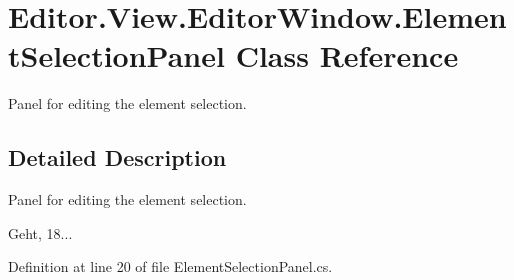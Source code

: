 \section{Editor.\-View.\-Editor\-Window.\-Element\-Selection\-Panel Class Reference}
\label{class_editor_1_1_view_1_1_editor_window_1_1_element_selection_panel}


Panel for editing the element selection.  




\subsection{Detailed Description}
Panel for editing the element selection. 

Geht, 18... 

Definition at line 20 of file Element\-Selection\-Panel.\-cs.

